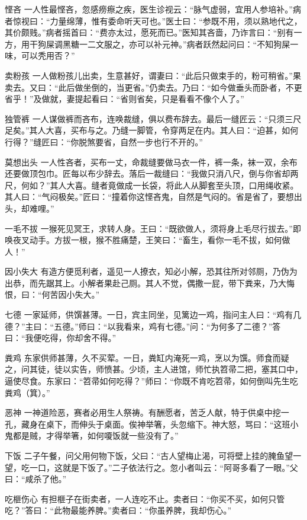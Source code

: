 \documentclass[12pt,UTF8]{ctexbook}
\begin{document}
悭吝
一人性最悭吝，忽感痨瘵之疾，医生诊视云：“脉气虚弱，宜用人参培补。”病者惊视曰：“力量绵薄，惟有委命听天可也。”医士曰：“参既不用，须以熟地代之，其价颇贱。”病者摇首曰：“费亦太过，愿死而已。”医知其吝啬，乃诈言曰：“别有一方，用干狗屎调黑糖一二文服之，亦可以补元神。”病者跃然起问曰：“不知狗屎一味，可以秃用否？”

卖粉孩
一人做粉孩儿出卖，生意甚好，谓妻曰：“此后只做束手的，粉可稍省。”果卖去。又曰：“此后做坐倒的，当更省。”仍卖去。乃曰：“如今做垂头而卧者，不更省乎！”及做就，妻提起看曰：“省则省矣，只是看看不像个人了。”

独管裤
一人谋做裤而吝布，连唤裁缝，俱以费布辞去。最后一缝匠云：“只须三尺足矣。”其人大喜，买布与之。乃缝一脚管，令穿两足在内。其人曰：“迫甚，如何行得？”缝匠曰：“你脱煞要省，自然一步也行不开的。”

莫想出头
一人性吝者，买布一丈，命裁缝要做马衣一件，裤一条，袜一双，余布还要做顶包巾。匠每以布少辞去。落后一裁缝曰：“我做只消八尺，倒与你省却两尺，何如？”其人大喜。缝者竟做成一长袋，将此人从脚套至头顶，口用绳收紧。其人曰：“气闷极矣。”匠曰：“撞着你这悭吝鬼，自然是气闷的。省是省了，要想出头，却难哩。”

一毛不拔
一猴死见冥王，求转人身。王曰：“既欲做人，须将身上毛尽行拔去。”即唤夜叉动手。方拔一根，猴不胜痛楚，王笑曰：“畜生，看你一毛不拔，如何做人！”

因小失大
有造方便觅利者，遥见一人撩衣，知必小解，恐其往所对邻厕，乃伪为出恭，而先踞其上。小解者果赴己厕。其人不觉，偶撒一屁，带下粪来，乃大悔恨，曰：“何苦因小失大。”

七德
一家延师，供馔甚薄。一日，宾主同坐，见篱边一鸡，指问主人曰：“鸡有几德？”主曰：“五德。”师曰：“以我看来，鸡有七德。”问：“为何多了二德？”答曰：“我便吃得，你却舍不得。”

粪鸡
东家供师甚薄，久不买荤。一日，粪缸内淹死一鸡，烹以为馔。师食而疑之，问其徒，徒以实告，师愤甚。少顷，主人进馆，师忙执笤帚二把，塞其口中，逼使尽食。东家曰：“笤帚如何吃得？”师曰：“你既不肯吃笤帚，如何倒叫先生吃粪鸡（箕）。”

恶神
一神道险恶，赛者必用生人祭祷。有酬愿者，苦乏人献，特于供桌中挖一孔，藏身在桌下，而伸头于桌面。俟神举箸，头忽缩下。神大怒，骂曰：“这班小鬼都是贼，才得举箸，如何嗄饭就一些没有了。”

下饭
二子午餐，问父用何物下饭，父曰：“古人望梅止渴，可将壁上挂的腌鱼望一望，吃一口，这就是下饭了。”二子依法行之。忽小者叫云：“阿哥多看了一眼。”父曰：“咸杀了他。”

吃榧伤心
有担榧子在街卖者，一人连吃不止。卖者曰：“你买不买，如何只管吃？”答曰：“此物最能养脾。”卖者曰：“你虽养脾，我却伤心。”
\end{document}
